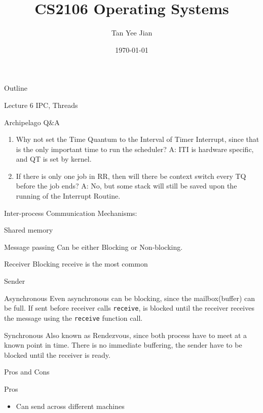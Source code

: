 \documentclass[presentation]{beamer}
\author{Tan Yee Jian}
\date{\today}
\title{CS2106 Operating Systems}
\begin{document}
\maketitle
\begin{frame}{Outline}
\tableofcontents
\end{frame}

\begin{frame}[label={sec:orgb061a4c},fragile]{Lecture 6 IPC, Threads}
 \begin{block}{Archipelago Q\&A}
\begin{enumerate}
\item Why not set the Time Quantum to the Interval of Timer Interrupt, since that
is the only important time to run the scheduler?
A: ITI is hardware specific, and QT is set by kernel.
\item If there is only one job in RR, then will there be context switch every TQ
before the job ends?
A: No, but some stack will still be saved upon the running of the Interrupt Routine.
\end{enumerate}
\end{block}
\begin{block}{Inter-process Communication}
Mechanisms:
\begin{block}{Shared memory}
\end{block}
\begin{block}{Message passing}
Can be either \alert{Blocking} or \alert{Non-blocking}.
\begin{block}{Receiver}
Blocking receive is the most common
\end{block}
\begin{block}{Sender}
\begin{block}{Asynchronous}
Even asynchronous can be blocking, since the mailbox(buffer) can be full.
If sent before receiver calls \texttt{receive}, is blocked until the receiver receives
the message using the \texttt{receive} function call.
\end{block}
\begin{block}{Synchronous}
Also known as \alert{Rendezvous}, since both process have to meet at a known point in time.
There is no immediate buffering, the sender have to be blocked until the
receiver is ready.
\end{block}
\end{block}
\begin{block}{Pros and Cons}
\begin{block}{Pros}
\begin{itemize}
\item Can send across different machines

\end{itemize}
\end{block}
\end{block}
\end{block}
\end{block}
\end{frame}
\end{document}
